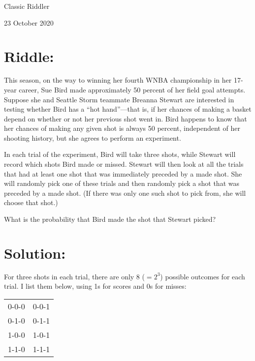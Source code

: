 \documentclass{article}
\begin{document}
\pagestyle{empty} %

\begin{center}
{\LARGE Classic Riddler}

\vspace{0.15in}

{\Large 23 October 2020}
\end{center}


\section*{Riddle:}

This season, on the way to winning her fourth WNBA championship in her 17-year career, Sue Bird made approximately 50 percent of her field goal attempts.
Suppose she and Seattle Storm teammate Breanna Stewart are interested in testing whether Bird has a ``hot hand''---that is, if her chances of making a basket depend on whether or not her previous shot went in.
Bird happens to know that her chances of making any given shot is always 50 percent, independent of her shooting history, but she agrees to perform an experiment.

In each trial of the experiment, Bird will take three shots, while Stewart will record which shots Bird made or missed.
Stewart will then look at all the trials that had at least one shot that was immediately preceded by a made shot.
She will randomly pick one of these trials and then randomly pick a shot that was preceded by a made shot.
(If there was only one such shot to pick from, she will choose that shot.)

What is the probability that Bird made the shot that Stewart picked?

\section*{Solution:}

For three shots in each trial, there are only 8 ($=2^{3}$) possible outcomes for each trial.
I list them below, using 1s for scores and 0s for misses:

\begin{center}
\begin{tabular}{cc}
0-0-0 & 0-0-1 \\
0-1-0 & 0-1-1 \\
1-0-0 & 1-0-1 \\
1-1-0 & 1-1-1
\end{tabular}
\end{center}
\end{document}

